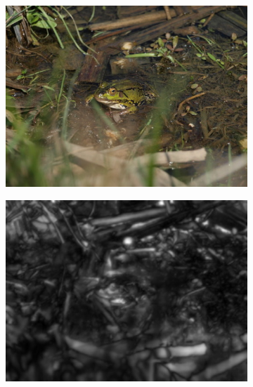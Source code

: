 \begin{figure}[H]
    \begin{subfigure}{0.32\textwidth}
      \centering
      \includegraphics[scale=1.0]{obrazky/ORIGzaba.JPG}
      \caption{}
    \end{subfigure}
    \begin{subfigure}{0.32\textwidth}
      \centering
      \includegraphics[scale=1.0]{obrazky/badIttiSM.jpg}
      \caption{}
      \label{obr:autocropFailsH}
    \end{subfigure}
    \begin{subfigure}{0.32\textwidth}
      \centering

\end{subfigure}
\end{figure}
